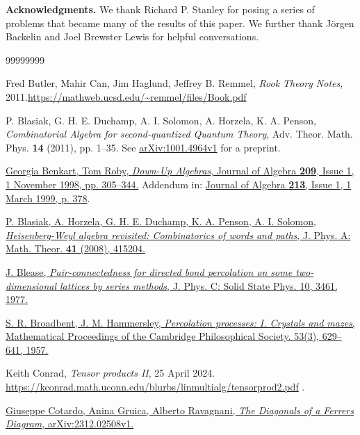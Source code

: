\documentclass[numbers=enddot,12pt,final,onecolumn,notitlepage]{scrartcl}%
\theoremstyle{definition}
\begin{document}
\bigskip

\textbf{Acknowledgments.}
We thank Richard P. Stanley for posing a series of problems that became many of the results of this paper.
We further thank J\"orgen Backelin and Joel Brewster Lewis for helpful conversations.


\begin{thebibliography}{99999999}

Fred Butler, Mahir Can, Jim Haglund, Jeffrey B.
Remmel, \textit{Rook Theory Notes}, 2011.\newline\url{https://mathweb.ucsd.edu/~remmel/files/Book.pdf}

P. Blasiak, G. H. E. Duchamp, A. I. Solomon, A. Horzela, K. A. Penson, \textit{Combinatorial Algebra for second-quantized Quantum Theory}, Adv. Theor. Math. Phys. \textbf{14} (2011), pp. 1--35. See \href{https://arxiv.org/abs/1001.4964v1}{arXiv:1001.4964v1} for a preprint.

\href{https://doi.org/10.1006/jabr.1998.7511}{Georgia Benkart, Tom Roby,
\textit{Down-Up Algebras},
Journal of Algebra \textbf{209}, Issue 1, 1 November 1998, pp. 305--344.}
Addendum in: \href{https://doi.org/10.1006/jabr.1998.7854}{Journal of Algebra \textbf{213}, Issue 1, 1 March 1999, p. 378}.

\href{https://doi.org/10.1088/1751-8113/41/41/415204}{
P. Blasiak, A. Horzela, G. H. E. Duchamp, K. A. Penson, A. I. Solomon, 
\textit{Heisenberg-Weyl algebra revisited: Combinatorics of words and paths}, 
J. Phys. A: Math. Theor. \textbf{41} (2008), 415204.}

\href{https://doi.org/10.1088/0022-3719/10/18/012}
{J. Blease, \textit{Pair-connectedness for directed bond percolation on some two-dimensional lattices by series methods}, J. Phys. C: Solid State Phys. 10, 3461, 1977.}

\href{https://doi.org/10.1017/S0305004100032680}
{S. R. Broadbent, J. M. Hammersley, \textit{Percolation processes: I. Crystals and mazes}, Mathematical Proceedings of the Cambridge Philosophical Society. 53(3), 629--641, 1957.}

Keith Conrad,
\textit{Tensor products II},
25 April 2024.
\url{https://kconrad.math.uconn.edu/blurbs/linmultialg/tensorprod2.pdf} .

\href{https://arxiv.org/abs/2312.02508v1}{Giuseppe Cotardo, Anina Gruica, Alberto Ravagnani, \textit{The Diagonals of a Ferrers Diagram}, arXiv:2312.02508v1.}


\end{thebibliography}
\end{document}
